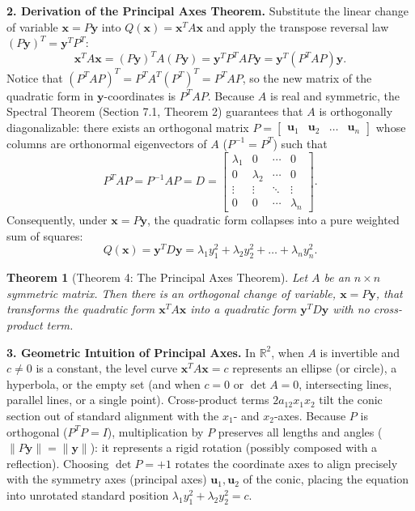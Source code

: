 \documentclass[11pt, letterpaper]{article}
\newtheorem{theorem}{Theorem}[section]
\theoremstyle{definition}
\theoremstyle{remark}
\newcommand{\R}{\mathbb{R}}
\begin{document}
\textbf{2. Derivation of the Principal Axes Theorem.}
Substitute the linear change of variable $\mathbf{x} = P\mathbf{y}$ into $Q(\mathbf{x}) = \mathbf{x}^T A \mathbf{x}$ and apply the transpose reversal law $(P\mathbf{y})^T = \mathbf{y}^T P^T$:
\[
\mathbf{x}^T A \mathbf{x} = (P\mathbf{y})^T A (P\mathbf{y}) = \mathbf{y}^T P^T A P \mathbf{y} = \mathbf{y}^T (P^T A P) \mathbf{y}.
\]
Notice that $(P^T A P)^T = P^T A^T (P^T)^T = P^T A P$, so the new matrix of the quadratic form in $\mathbf{y}$-coordinates is $P^T A P$. Because $A$ is real and symmetric, the Spectral Theorem (Section 7.1, Theorem 2) guarantees that $A$ is orthogonally diagonalizable: there exists an orthogonal matrix $P = \begin{bmatrix} \mathbf{u}_1 & \mathbf{u}_2 & \dots & \mathbf{u}_n \end{bmatrix}$ whose columns are orthonormal eigenvectors of $A$ ($P^{-1} = P^T$) such that
\[
P^T A P = P^{-1} A P = D = \begin{bmatrix} \lambda_1 & 0 & \cdots & 0 \\ 0 & \lambda_2 & \cdots & 0 \\ \vdots & \vdots & \ddots & \vdots \\ 0 & 0 & \cdots & \lambda_n \end{bmatrix}.
\]
Consequently, under $\mathbf{x} = P\mathbf{y}$, the quadratic form collapses into a pure weighted sum of squares:
\[
Q(\mathbf{x}) = \mathbf{y}^T D \mathbf{y} = \lambda_1 y_1^2 + \lambda_2 y_2^2 + \dots + \lambda_n y_n^2.
\]

\begin{theorem}[Theorem 4: The Principal Axes Theorem]
Let $A$ be an $n \times n$ symmetric matrix. Then there is an orthogonal change of variable, $\mathbf{x} = P\mathbf{y}$, that transforms the quadratic form $\mathbf{x}^T A \mathbf{x}$ into a quadratic form $\mathbf{y}^T D \mathbf{y}$ with no cross-product term.
\end{theorem}

\textbf{3. Geometric Intuition of Principal Axes.}
In $\R^2$, when $A$ is invertible and $c \neq 0$ is a constant, the level curve $\mathbf{x}^T A \mathbf{x} = c$ represents an ellipse (or circle), a hyperbola, or the empty set (and when $c = 0$ or $\det A = 0$, intersecting lines, parallel lines, or a single point). Cross-product terms $2a_{12}x_1x_2$ tilt the conic section out of standard alignment with the $x_1$- and $x_2$-axes. Because $P$ is orthogonal ($P^T P = I$), multiplication by $P$ preserves all lengths and angles ($\|P\mathbf{y}\| = \|\mathbf{y}\|$): it represents a rigid rotation (possibly composed with a reflection). Choosing $\det P = +1$ rotates the coordinate axes to align precisely with the symmetry axes (principal axes) $\mathbf{u}_1, \mathbf{u}_2$ of the conic, placing the equation into unrotated standard position $\lambda_1 y_1^2 + \lambda_2 y_2^2 = c$.
\end{document}
